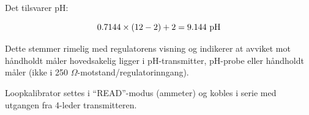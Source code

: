 Det tilsvarer pH:

$$0.7144 \times (12 - 2) + 2 = 9.144 \hbox{ pH}$$

\vskip 10pt

Dette stemmer rimelig med regulatorens visning og indikerer at avviket mot håndholdt måler hovedsakelig ligger i pH-transmitter, pH-probe eller håndholdt måler (ikke i 250 $\Omega$-motstand/regulatorinngang).
 
\vskip 10pt

Loopkalibrator settes i ``READ''-modus (ammeter) og kobles i serie med utgangen fra 4-leder transmitteren.









